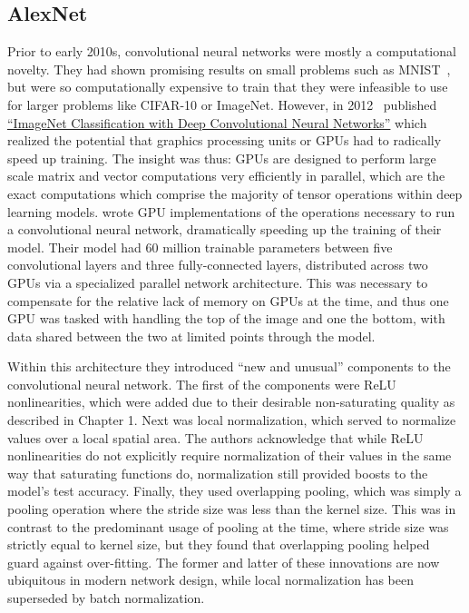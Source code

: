 \subsection{AlexNet}
Prior to early 2010s, convolutional neural networks were mostly a computational novelty. They had shown promising results on
small problems such as MNIST~\citep{lecun1989}, but were so computationally expensive to train that they were infeasible to use
for larger problems like CIFAR-10 or ImageNet. However, in 2012~\citeauthor{kriv2012}
published \hyperlink{cite.kriv2012}{``ImageNet Classification with Deep Convolutional Neural Networks''} which realized the potential that
graphics processing units or GPUs had to radically speed up training. The insight was thus: GPUs are designed to perform large scale
matrix and vector computations very efficiently in parallel, which are the exact computations which comprise the majority
of tensor operations within deep learning models. \citeauthor{kriv2012} wrote GPU implementations
of the operations necessary to run a convolutional neural network, dramatically speeding up the training of their model.
Their model had 60 million trainable parameters between five convolutional layers and three fully-connected layers, distributed
across two GPUs via a specialized parallel network architecture.
This was necessary to compensate for the relative lack of memory on GPUs at the time, and thus one GPU was tasked with
handling the top of the image and one the bottom, with data shared between
the two at limited points through the model.

Within this architecture they introduced ``new and unusual'' components to the convolutional neural network. The first of the
components were ReLU nonlinearities, which were added due to their desirable non-saturating quality as
described in Chapter 1. Next was local normalization, which served to normalize values over a local spatial area. The authors
acknowledge that while ReLU nonlinearities do not explicitly require normalization of their values in the same way that
saturating functions do, normalization still provided boosts to the model's test accuracy. Finally, they used overlapping
pooling, which was simply a pooling operation where the stride size was less than the kernel size. This was in contrast
to the predominant usage of pooling at the time, where stride size was strictly equal to kernel size, but they found that
overlapping pooling helped guard against over-fitting. The former and latter of these innovations are now ubiquitous
in modern network design, while local normalization has been superseded by batch normalization.

